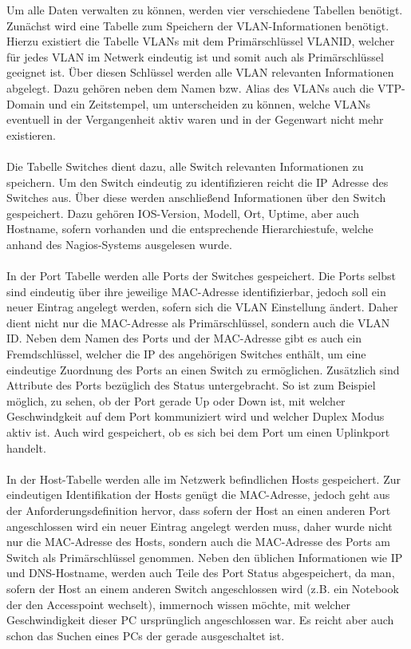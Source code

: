 Um alle Daten verwalten zu können, werden vier verschiedene Tabellen benötigt.
Zunächst wird eine Tabelle zum Speichern der VLAN-Informationen benötigt.
Hierzu existiert die Tabelle VLANs mit dem Primärschlüssel VLANID, welcher für jedes VLAN im Netwerk eindeutig ist und somit auch als Primärschlüssel geeignet ist. Über diesen Schlüssel werden alle VLAN relevanten Informationen abgelegt. Dazu gehören neben dem Namen bzw. Alias des VLANs auch die VTP-Domain und ein Zeitstempel, um unterscheiden zu können, welche VLANs eventuell in der Vergangenheit aktiv waren und in der Gegenwart nicht mehr existieren.\\\\
Die Tabelle Switches dient dazu, alle Switch relevanten Informationen zu speichern. 
Um den Switch eindeutig zu identifizieren reicht die IP Adresse des Switches aus. Über diese werden anschließend Informationen über den Switch gespeichert. Dazu gehören IOS-Version, Modell, Ort, Uptime, aber auch Hostname, sofern vorhanden und die entsprechende Hierarchiestufe, welche anhand des Nagios-Systems ausgelesen wurde.\\\\
In der Port Tabelle werden alle Ports der Switches gespeichert. Die Ports selbst sind eindeutig über ihre jeweilige MAC-Adresse identifizierbar, jedoch soll ein neuer Eintrag angelegt werden, sofern sich die VLAN Einstellung ändert.
Daher dient nicht nur die MAC-Adresse als Primärschlüssel, sondern auch die VLAN ID.
Neben dem Namen des Ports und der MAC-Adresse gibt es auch ein Fremdschlüssel, welcher die IP des angehörigen Switches enthält, um eine eindeutige Zuordnung des Ports an einen Switch zu ermöglichen.
Zusätzlich sind Attribute des Ports bezüglich des Status untergebracht.
So ist zum Beispiel möglich, zu sehen, ob der Port gerade Up oder Down ist, mit welcher Geschwindgkeit auf dem Port kommuniziert wird und welcher Duplex Modus aktiv ist. Auch wird gespeichert, ob es sich bei dem Port um einen Uplinkport handelt.\\\\
In der Host-Tabelle werden alle im Netzwerk befindlichen Hosts gespeichert.
Zur eindeutigen Identifikation der Hosts genügt die MAC-Adresse, jedoch geht aus der Anforderungsdefinition hervor, dass sofern der Host an einen anderen Port angeschlossen wird ein neuer Eintrag angelegt werden muss, daher wurde nicht nur die MAC-Adresse des Hosts, sondern auch die MAC-Adresse des Ports am Switch als Primärschlüssel genommen. Neben den üblichen Informationen wie IP und DNS-Hostname, werden auch Teile des Port Status abgespeichert, da man, sofern der Host an einem anderen Switch angeschlossen wird (z.B. ein Notebook der den Accesspoint wechselt), immernoch wissen möchte, mit welcher Geschwindigkeit dieser PC ursprünglich angeschlossen war. Es reicht aber auch schon das Suchen eines PCs der gerade ausgeschaltet ist.
